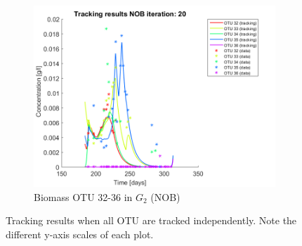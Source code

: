 \documentclass[processes,article,submit,moreauthors,pdftex]{Definitions/mdpi}
\begin{document}
\begin{figure}[h]
\begin{subfigure}{0.45 \textwidth}
		\includegraphics[width =\textwidth]{Application//200407_iter_20_NOB_plot_1}
		\caption{Biomass OTU 32-36 in $G_2$ (NOB) }
	\end{subfigure}
	\caption{Tracking results when all OTU are tracked independently. Note the different y-axis scales of each plot.}
	\label{OTU abudance all}
\end{figure}
\end{document}
